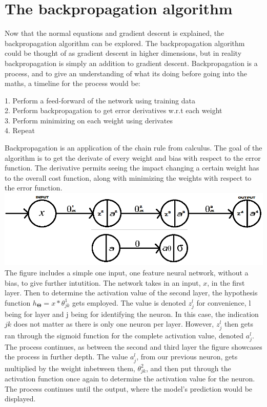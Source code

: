 \documentclass[a4paper,12pt]{article}
\begin{document}
\section{The backpropagation algorithm}
Now that the normal equations and gradient descent is explained, the backpropagation algorithm can be explored. The backpropagation algorithm could be thought of as gradient descent in higher dimensions, but in reality backpropagation is simply an addition to gradient descent. Backpropagation is a process, and to give an understanding of what its doing before going into the maths, a timeline for the process would be: 
\begin{center} 1. Perform a feed-forward of the network using training data
\\ 2. Perform backpropagation to get error derivatives w.r.t each weight
\\ 3. Perform minimizing on each weight using derivates
\\ 4. Repeat\end{center}
Backpropagation is an application of the chain rule from calculus. The goal of the algorithm is to get the derivate of every weight and bias with respect to the error function. The derivative permits seeing the impact changing a certain weight has to the overall cost function, along with minimizing the weights with respect to the error function. 
\\
\includegraphics[scale=0.548]{onedimension}
\\
The figure includes a simple one input, one feature neural network, without a bias, to give further intutition. The network takes in an input, $x$, in the first layer. Then to determine the activation value of the second layer, the hypothesis function $h_{\boldsymbol{\Theta}} = x*\theta_{jk}^1$ gets employed. The value is denoted $z^l_j$ for convenience, l being for layer and j being for identifying the neuron. In this case, the indication $jk$ does not matter as there is only one neuron per layer. However, $z^l_j$ then gets ran through the sigmoid function for the complete activation value, denoted $a^l_j$. The process continues, as between the second and third layer the figure showcases the process in further depth. The value $a^l_j$, from our previous neuron, gets multiplied by the weight inbetween them, $\theta_{jk}^2$, and then put through the activation function once again to determine the activation value for the neuron. The process continues until the output, where the model's prediction would be displayed. 
\end{document}
